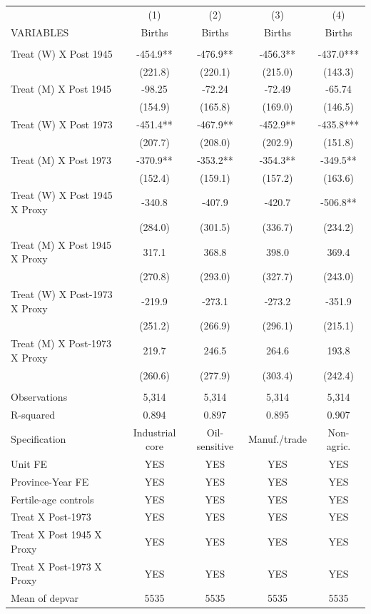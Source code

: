 \begin{tabular}{lcccc} \hline
 & (1) & (2) & (3) & (4) \\
VARIABLES & Births & Births & Births & Births \\ \hline
 &  &  &  &  \\
Treat (W) X Post 1945 & -454.9** & -476.9** & -456.3** & -437.0*** \\
 & (221.8) & (220.1) & (215.0) & (143.3) \\
Treat (M) X Post 1945 & -98.25 & -72.24 & -72.49 & -65.74 \\
 & (154.9) & (165.8) & (169.0) & (146.5) \\
Treat (W) X Post 1973 & -451.4** & -467.9** & -452.9** & -435.8*** \\
 & (207.7) & (208.0) & (202.9) & (151.8) \\
Treat (M) X Post 1973 & -370.9** & -353.2** & -354.3** & -349.5** \\
 & (152.4) & (159.1) & (157.2) & (163.6) \\
Treat (W) X Post 1945 X Proxy & -340.8 & -407.9 & -420.7 & -506.8** \\
 & (284.0) & (301.5) & (336.7) & (234.2) \\
Treat (M) X Post 1945 X Proxy & 317.1 & 368.8 & 398.0 & 369.4 \\
 & (270.8) & (293.0) & (327.7) & (243.0) \\
Treat (W) X Post-1973 X Proxy & -219.9 & -273.1 & -273.2 & -351.9 \\
 & (251.2) & (266.9) & (296.1) & (215.1) \\
Treat (M) X Post-1973 X Proxy & 219.7 & 246.5 & 264.6 & 193.8 \\
 & (260.6) & (277.9) & (303.4) & (242.4) \\
 &  &  &  &  \\
Observations & 5,314 & 5,314 & 5,314 & 5,314 \\
R-squared & 0.894 & 0.897 & 0.895 & 0.907 \\
Specification & Industrial core & Oil-sensitive & Manuf./trade & Non-agric. \\
Unit FE & YES & YES & YES & YES \\
Province-Year FE & YES & YES & YES & YES \\
Fertile-age controls & YES & YES & YES & YES \\
Treat X Post-1973 & YES & YES & YES & YES \\
Treat X Post 1945 X Proxy & YES & YES & YES & YES \\
Treat X Post-1973 X Proxy & YES & YES & YES & YES \\
 Mean of depvar & 5535 & 5535 & 5535 & 5535 \\ \hline
\end{tabular}
